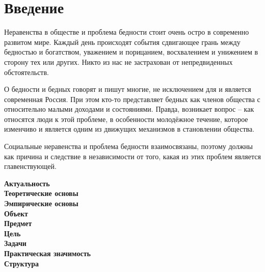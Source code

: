 \chapter*{Введение}

Неравенства в обществе и проблема бедности стоит очень остро в современно 
развитом мире. Каждый день происходят события сдвигающее грань между бедностью 
и богатством, уважением и порицанием, восхвалением и унижением в сторону тех 
или других. Никто из нас не застрахован от непредвиденных обстоятельств.

О бедности и бедных говорят и пишут многие, не исключением для и является 
современная Россия. При этом кто-то представляет бедных как членов общества с 
относительно малыми доходами и состояниями. Правда, возникает вопрос -- 
как относятся люди к этой проблеме, в особенности молодёжное течение, которое 
изменчиво и является одним из движущих механизмов в становлении общества.

Социальные неравенства и проблема бедности взаимосвязаны, поэтому должны как 
причина и следствие в независимости от того, какая из этих проблем является 
главенствующей.

\textbf{Актуальность} \\
\textbf{Теоретические основы} \\
\textbf{Эмпирические основы} \\
\textbf{Объект} \\
\textbf{Предмет} \\
\textbf{Цель} \\
\textbf{Задачи} \\
\textbf{Практическая значимость} \\
\textbf{Структура} \\

\pagebreak